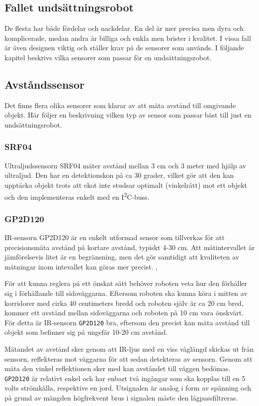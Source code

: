 \documentclass[11pt]{article}
\begin{document}
\begin{flushleft}
\pagebreak
\section{Fallet undsättningsrobot}
De flesta har både fördelar och nackdelar. En del är mer precisa men dyra och komplicerade, medan andra är billiga och enkla men brister i kvalitet. I vissa fall är även designen viktig och ställer krav på de sensorer som används. I följande kapitel beskrivs vilka sensorer som passar för en undsättningsrobot. 

\subsection{Avståndssensor}
Det finns flera olika sensorer som klarar av att mäta avstånd till omgivande objekt. Här följer en beskrivning vilken typ av sensor som passar bäst till just en undsättningsrobot. 

\subsubsection{SRF04} %
Ultraljudssensorn SRF04 mäter avstånd mellan 3 cm och 3 meter med hjälp av ultraljud. Den har en detektionskon på ca 30 grader, vilket gör att den kan upptäcka objekt trots att ekot inte studsar optimalt (vinkelrätt) mot ett objekt och den implementeras enkelt med en I\textsuperscript{2}C-buss. \cite{Devantech}

\subsubsection{GP2D120} %
IR-sensorn GP2D120 är en enkelt utformad sensor som tillverkas för att precisionsmäta avstånd på kortare avstånd, typiskt 4-30 cm. Att mätintervallet är jämförelsevis litet är en begränsning, men det gör samtidigt att kvaliteten av mätningar inom intevallet kan göras mer precist. \cite{website:cmu}, \cite{Sharp}

För att kunna reglera på ett önskat sätt behöver roboten veta hur den förhåller sig i förhållande till sidoväggarna. Eftersom roboten ska kunna köra i mitten av korridorer med cirka 40 centimeters bredd och roboten själv är ca 20 cm bred, kommer ett avstånd mellan sidoväggarna och roboten på 10 cm vara önskvärt. För detta är IR-sensorn \verb+GP2D120+ bra, eftersom den precist kan mäta avstånd till objekt som befinner sig på ungefär 10-20 cm avstånd.

Mätandet av avstånd sker genom att IR-ljus med en viss våglängd skickas ut från sensorn, reflekteras mot väggarna för att sedan detekteras av sensorn. Genom att mäta den vinkel reflektionen sker med kan avståndet till väggen bedömas. \verb+GP2D120+ är relativt enkel och har enbart två ingångar som ska kopplas till en 5 volts strömkälla, respektive en jord.  Utsignalen är analog i form av spänning och på grund av mängden högfrekvent brus i signalen måste den lågpassfiltreras. \cite{Sharp}


\end{flushleft}
\end{document}
